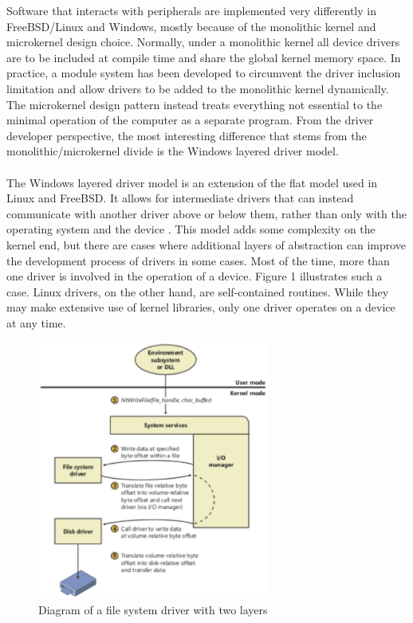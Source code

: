 \documentclass[10pt,draftclsnofoot,onecolumn]{article}
\begin{document}
Software that interacts with peripherals are implemented very differently in FreeBSD/Linux and Windows, mostly because of the monolithic kernel and microkernel design choice. Normally, under a monolithic kernel all device drivers are to be included at compile time and share the global kernel memory space. In practice, a module system has been developed to circumvent the driver inclusion limitation and allow drivers to be added to the monolithic kernel dynamically. The microkernel design pattern instead treats everything not essential to the minimal operation of the computer as a separate program. From the driver developer perspective, the most interesting difference that stems from the monolithic/microkernel divide is the Windows layered driver model.
\\\\
The Windows layered driver model is an extension of the flat model used in Linux and FreeBSD. It allows for intermediate drivers that can instead communicate with another driver above or below them, rather than only with the operating system and the device \cite{Wandos}. This model adds some complexity on the kernel end, but there are cases where additional layers of abstraction can improve the development process of drivers in some cases. Most of the time, more than one driver is involved in the operation of a device. Figure 1 illustrates such a case. Linux drivers, on the other hand, are self-contained routines. While they may make extensive use of kernel libraries, only one driver operates on a device at any time. \\

\begin{figure}[h!]
	\centering
	\includegraphics[width=3in]{wld}
	\caption{Diagram of a file system driver with two layers}
	\label{fig:layered}
\end{figure}
\end{document}
